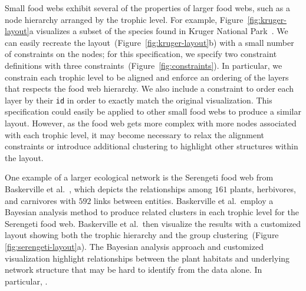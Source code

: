 Small food webs exhibit several of the properties of larger food webs, such
as a node hierarchy arranged by the trophic level.
For example, Figure~\ref{fig:kruger-layout}a visualizes a subset of the
species found in Kruger National Park~\cite{kruger2017}. We can easily 
recreate the layout~(Figure~\ref{fig:kruger-layout}b) with a small 
number of constraints on the nodes; for this specification, we specify 
two constraint definitions with three constraints~(Figure~\ref{fig:constraints}).
In particular, we constrain each trophic level to be aligned and enforce an
ordering of the layers that respects the food web hierarchy. We also
include a constraint to order each layer by their \texttt{id} in order
to exactly match the original visualization. This \projectname specification 
could easily be applied to other small food webs to produce a similar layout.
However, as the food web gets more complex with more nodes associated with
each trophic level, it may become necessary to relax the alignment
constraints or introduce additional clustering to highlight other
structures within the layout.


One example of a larger ecological network is the Serengeti food web from
Baskerville et al.~\cite{baskerville2011spatial}, which depicts the
relationships among $161$ plants, herbivores, and carnivores with $592$ links
between entities. Baskerville et al.\ employ a Bayesian analysis method to
produce related clusters in each trophic level for the Serengeti food web.
Baskerville et al.\ then visualize the results with a
customized layout showing both the trophic hierarchy and
the group clustering~(Figure \ref{fig:serengeti-layout}a). The Bayesian
analysis approach and customized visualization highlight relationships between
the plant habitats and underlying network structure that may be hard to identify
from the data alone. In particular, .

